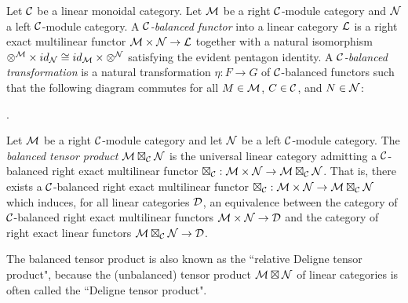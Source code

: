 \documentclass{amsart}
\begin{document}
\begin{definition}
	Let $\mathcal C$ be a linear monoidal category. 
	Let $\mathcal M$ be a right $\mathcal C$-module category and $\mathcal N$ a left $\mathcal C$-module category. A {\em $\mathcal C$-balanced functor} into a linear category $\mathcal L$ is a right exact multilinear functor $\mathcal M \times \mathcal N \to \mathcal L$ together with a natural isomorphism $\otimes^{\mathcal M} \times id_{\mathcal N} \cong id_{\mathcal M} \times \otimes^{\mathcal N}$ satisfying the evident pentagon identity. A {\em $\mathcal C$-balanced transformation} is a natural transformation $\eta:F \to G$ of $\mathcal C$-balanced functors such that the following diagram commutes for all $M \in \mathcal M$, $C \in \mathcal C$, and $N \in \mathcal N$:
\begin{center}
.
\end{center}
\end{definition}


\begin{definition}
	Let $\mathcal M$ be a right $\mathcal C$-module category and let $\mathcal N$ be a left $\mathcal C$-module category. The {\em balanced tensor product} $\mathcal M \boxtimes_{\mathcal C} \mathcal N$
	is the universal linear category admitting a $\mathcal C$-balanced right exact multilinear functor $\boxtimes_{\mathcal C}: \mathcal M \times \mathcal N \to \mathcal M \boxtimes_{\mathcal C} \mathcal N$. That is, there exists a $\mathcal C$-balanced right exact multilinear functor $\boxtimes_{\mathcal C}: \mathcal M \times \mathcal N \to \mathcal M \boxtimes_{\mathcal C} \mathcal N$ which induces, for all linear categories $\mathcal D$, an equivalence between the category of $\mathcal C$-balanced right exact multilinear functors $\mathcal M \times \mathcal N \to \mathcal D$ and the category of right exact linear functors $\mathcal M \boxtimes_{\mathcal C} \mathcal N \to \mathcal D$. 
\end{definition}
\nid The balanced tensor product is also known as the ``relative Deligne tensor product", because the (unbalanced) tensor product $\mathcal M \boxtimes \mathcal N$ of linear categories is often called the ``Deligne tensor product".
\end{document}
